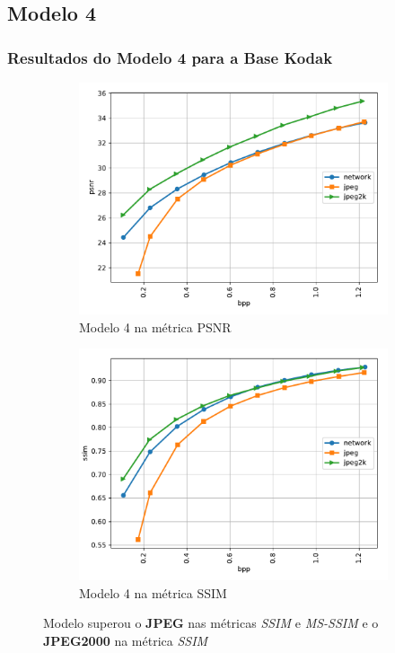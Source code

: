 \documentclass{beamer}
\begin{document}
\subsection{Modelo 4}
\begin{frame}
\frametitle{Resultados do Modelo 4 para a Base Kodak~\cite{kodak}}
\begin{figure}
\centering
\begin{subfigure}{.5\textwidth}
  \centering
  \includegraphics[width=.8\textwidth]{figs/_mean_plot_psnr_10levels.pdf}
  \caption{Modelo 4 na métrica PSNR}
  \label{fig:mod4_1:sub1}
\end{subfigure}%
\begin{subfigure}{.5\textwidth}
  \centering
  \includegraphics[width=.8\textwidth]{figs/_mean_plot_ssim_10levels.pdf}
  \caption{Modelo 4 na métrica SSIM}
  \label{fig:mod4_1:sub2}
\end{subfigure}
\caption{Modelo superou o \textbf{JPEG} nas métricas \textit{SSIM} e \textit{MS-SSIM} e o \textbf{JPEG2000} na métrica \textit{SSIM}}
\label{fig:mod4_1}
\end{figure}
\end{frame}
\end{document}

